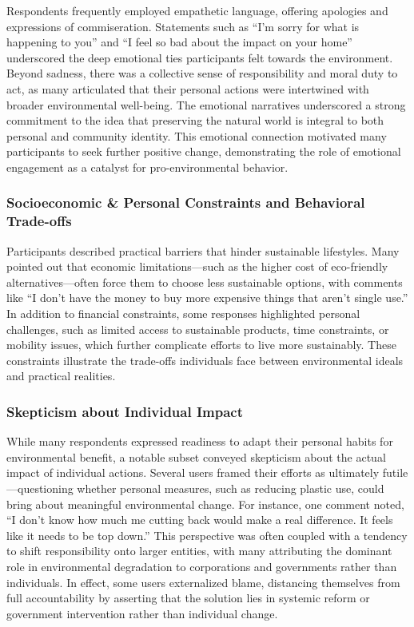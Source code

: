 \documentclass[sigconf, nonacm]{acmart}
\begin{document}
Respondents frequently employed empathetic language, offering apologies and expressions of commiseration. Statements such as “I’m sorry for what is happening to you” and “I feel so bad about the impact on your home” underscored the deep emotional ties participants felt towards the environment. Beyond sadness, there was a collective sense of responsibility and moral duty to act, as many articulated that their personal actions were intertwined with broader environmental well-being. The emotional narratives underscored a strong commitment to the idea that preserving the natural world is integral to both personal and community identity. This emotional connection motivated many participants to seek further positive change, demonstrating the role of emotional engagement as a catalyst for pro-environmental behavior.

\subsubsection{Socioeconomic \& Personal Constraints and Behavioral Trade-offs}
Participants described practical barriers that hinder sustainable lifestyles. Many pointed out that economic limitations—such as the higher cost of eco-friendly alternatives—often force them to choose less sustainable options, with comments like “I don't have the money to buy more expensive things that aren't single use.” In addition to financial constraints, some responses highlighted personal challenges, such as limited access to sustainable products, time constraints, or mobility issues, which further complicate efforts to live more sustainably. These constraints illustrate the trade-offs individuals face between environmental ideals and practical realities.

\subsubsection{Skepticism about Individual Impact}
While many respondents expressed readiness to adapt their personal habits for environmental benefit, a notable subset conveyed skepticism about the actual impact of individual actions. Several users framed their efforts as ultimately futile—questioning whether personal measures, such as reducing plastic use, could bring about meaningful environmental change. For instance, one comment noted, “I don't know how much me cutting back would make a real difference. It feels like it needs to be top down.” This perspective was often coupled with a tendency to shift responsibility onto larger entities, with many attributing the dominant role in environmental degradation to corporations and governments rather than individuals. In effect, some users externalized blame, distancing themselves from full accountability by asserting that the solution lies in systemic reform or government intervention rather than individual change.
\end{document}
